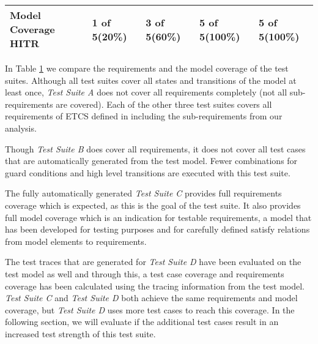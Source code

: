 \begin{table}
\begin{tabular}{p{38mm}p{20mm}p{20mm}p{20mm}p{20mm}}
{\bf Model Coverage}\newline
HITR&
1 of 5\newline(20\%)&
3 of 5\newline(60\%)&
5 of 5\newline(100\%)&
5 of 5\newline(100\%)
\\\hline\hline
\end{tabular}
\normalsize
\label{tab:rtt:advanced}
\end{table}%


In Table \ref{tab:rtt:advanced} we compare the requirements and the model coverage
of the test suites. Although all test suites cover all states and transitions of
the model at least once, \emph{Test Suite A} does not cover all requirements
completely (not all sub-requirements are covered).
Each of the other three test suites covers all requirements
of ETCS defined in \cite{ETCS-Subset076} including the sub-requirements from our
analysis.

Though \emph{Test Suite B} does cover all requirements, it does not cover all
test cases that are automatically generated from the test model.
Fewer combinations for guard conditions and high level transitions are executed
with this test suite.

The fully automatically generated \emph{Test Suite C} provides full requirements
coverage which is expected, as this is the goal of the test suite.
It also provides full model coverage which is an indication for testable
requirements, a model that has been developed for testing purposes and for
carefully defined satisfy relations from model elements to requirements.

The test traces that are generated for \emph{Test Suite D} have been evaluated on
the test model as well and through this, a test case coverage and requirements coverage
has been calculated using the tracing information from the test model.
\emph{Test Suite C} and \emph{Test Suite D} both achieve the same requirements
and model coverage, but \emph{Test Suite D} uses more test cases to reach this
coverage. In the following section, we will evaluate if the additional test cases
result in an increased test strength of this test suite.
